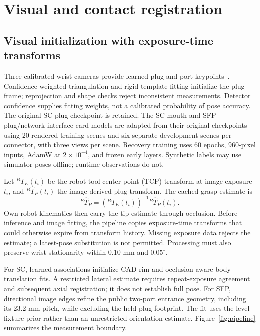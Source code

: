\documentclass[letterpaper,10pt,conference]{ieeeconf}
\begin{document}
\section{Visual and contact registration}
\subsection{Visual initialization with exposure-time transforms}
Three calibrated wrist cameras provide learned plug and port keypoints~\cite{team}.
Confidence-weighted triangulation and rigid template fitting initialize the
plug frame; reprojection and shape checks reject inconsistent measurements.
Detector confidence supplies fitting weights, not a calibrated probability of
pose accuracy. The original SC plug checkpoint is retained. The SC mouth and
SFP plug/network-interface-card models are adapted from their original
checkpoints using 20 rendered training scenes and six separate development
scenes per connector, with three views per scene. Recovery training uses
60 epochs, 960-pixel inputs, AdamW at $2\times10^{-4}$, and frozen early layers.
Synthetic labels may use simulator poses offline; runtime observations do not.

Let ${}^{B}T_E(t_i)$ be the robot tool-center-point (TCP) transform at image
exposure $t_i$, and ${}^{B}\widehat T_P(t_i)$ the image-derived plug transform.
The cached grasp estimate is
\begin{equation}
 {}^{E}\widehat T_P=
 ({}^{B}T_E(t_i))^{-1}{}^{B}\widehat T_P(t_i).
 \label{eq:grasp}
\end{equation}
Own-robot kinematics then carry the tip estimate through occlusion. Before
inference and image fitting, the pipeline copies exposure-time transforms
that could otherwise expire from transform history. Missing exposure data
rejects the estimate; a latest-pose substitution is not permitted. Processing must
also preserve wrist stationarity within 0.10 mm and $0.05^\circ$.

For SC, learned associations initialize CAD rim and occlusion-aware body
translation fits. A restricted lateral estimate requires repeat-exposure
agreement and subsequent axial registration; it does not establish full pose.
For SFP, directional image edges refine the public two-port entrance geometry,
including its 23.2 mm pitch, while excluding the held-plug footprint.
The fit uses the level-fixture prior rather than an unrestricted orientation
estimate. Figure~\ref{fig:pipeline} summarizes the measurement boundary.
\end{document}
